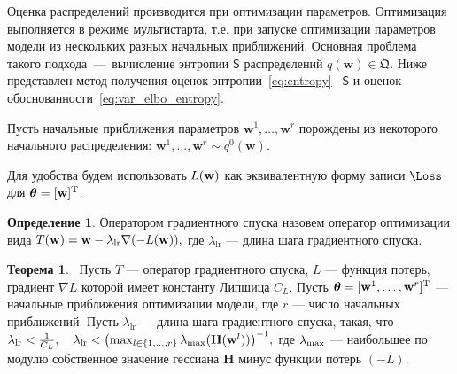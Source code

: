 \documentclass[11pt, a5paper]{dissert}
\theoremstyle{definition}
\newtheorem{theorem}{Теорема}
\newtheorem{defin}{Определение}
\begin{document}
{Оценка распределений производится при оптимизации параметров. Оптимизация выполняется в режиме мультистарта, т.е. при запуске оптимизации параметров модели из нескольких разных начальных приближений. Основная проблема такого подхода~---~вычисление энтропии $\mathsf{S}$ распределений $q(\mathbf{w}) \in \mathfrak{Q}$. Ниже представлен метод получения оценок энтропии~\eqref{eq:entropy} ~$\mathsf{S}$ и оценок обоснованности~\eqref{eq:var_elbo_entropy}.


Пусть начальные приближения параметров $\mathbf{w}^1, \dots, \mathbf{w}^r$ порождены из некоторого начального распределения:
$
	\mathbf{w}^1, \dots, \mathbf{w}^r \sim q^0(\mathbf{w}). 
$

Для удобства будем использовать $L(\mathbf{w})$ как эквивалентную форму записи $\Loss$ для $\boldsymbol{\theta} = [\mathbf{w}]^\text{T}$. 
\begin{defin}
Оператором градиентного спуска назовем оператор оптимизации вида
$	T(\mathbf{w})  = \mathbf{w} - \lambda_{\text{lr}} \nabla (-L(\mathbf{w})), $
где  $\lambda_{\text{lr}}$ --- длина шага градиентного спуска.
\end{defin}

\begin{theorem}~Пусть $T$ --- оператор градиентного спуска,
 $L$ --- функция потерь, градиент $\nabla L$ которой имеет константу Липшица $C_L$.  Пусть $\boldsymbol{\theta} = [\mathbf{w}^1,\dots,\mathbf{w}^r]^\text{T}$ ---  начальные приближения оптимизации модели, где $r$ --- число начальных приближений. Пусть $\lambda_{\text{lr}}$ --- длина шага градиентного спуска, такая, что
$
\lambda_{\text{lr}}<\frac{1}{C_L}, \quad \lambda_{\text{lr}} < \bigl(\max_{l \in \{1,\dots,r\}}\lambda_\textnormal{max} (\mathbf{H}(\mathbf{w}^l))\bigr)^{-1}, 
$
где $\lambda_\textnormal{max}$ --- наибольшее по модулю собственное значение гессиана  $\mathbf{H}$ минус функции потерь $(-L)$.


\end{theorem}}
\end{document}
